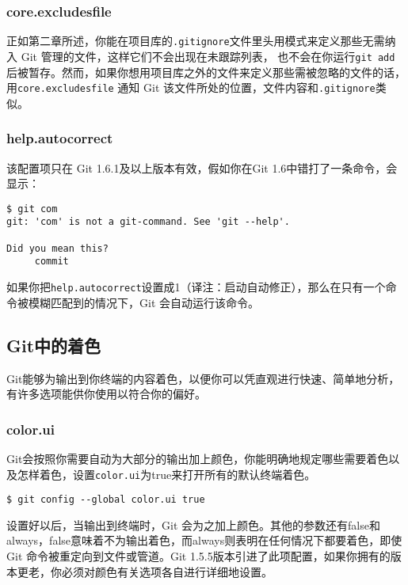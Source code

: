 \documentclass[a4paper]{book}
\begin{document}
\subsubsection{core.excludesfile}

正如第二章所述，你能在项目库的\texttt{.gitignore}文件里头用模式来定义那些无需纳入 Git 管理的文件，这样它们不会出现在未跟踪列表， 也不会在你运行\texttt{git add}后被暂存。然而，如果你想用项目库之外的文件来定义那些需被忽略的文件的话，用\texttt{core.excludesfile} 通知 Git 该文件所处的位置，文件内容和\texttt{.gitignore}类似。

\subsubsection{help.autocorrect}

该配置项只在 Git 1.6.1及以上版本有效，假如你在Git 1.6中错打了一条命令，会显示：

\begin{shaded}\begin{verbatim}
$ git com
git: 'com' is not a git-command. See 'git --help'.

Did you mean this?
     commit
\end{verbatim}\end{shaded}

如果你把\texttt{help.autocorrect}设置成1（译注：启动自动修正），那么在只有一个命令被模糊匹配到的情况下，Git 会自动运行该命令。

\subsection{Git中的着色}

Git能够为输出到你终端的内容着色，以便你可以凭直观进行快速、简单地分析，有许多选项能供你使用以符合你的偏好。

\subsubsection{color.ui}

Git会按照你需要自动为大部分的输出加上颜色，你能明确地规定哪些需要着色以及怎样着色，设置\texttt{color.ui}为true来打开所有的默认终端着色。

\begin{shaded}\begin{verbatim}
$ git config --global color.ui true
\end{verbatim}\end{shaded}

设置好以后，当输出到终端时，Git 会为之加上颜色。其他的参数还有false和always，false意味着不为输出着色，而always则表明在任何情况下都要着色，即使 Git 命令被重定向到文件或管道。Git 1.5.5版本引进了此项配置，如果你拥有的版本更老，你必须对颜色有关选项各自进行详细地设置。
\end{document}
